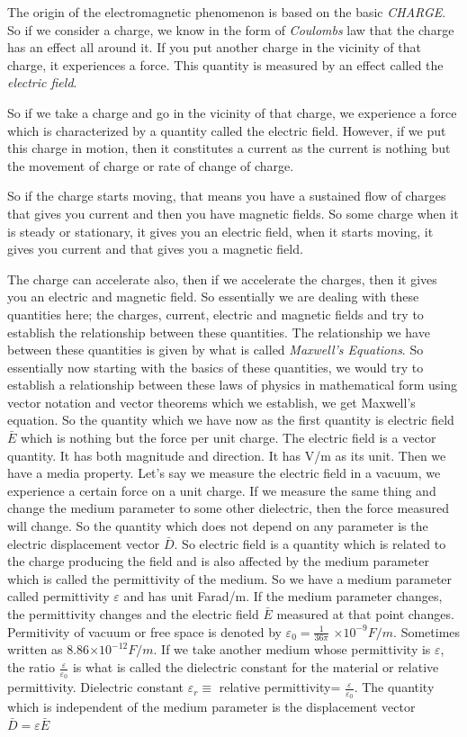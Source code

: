 The origin of the electromagnetic phenomenon is based on the basic \emph{CHARGE}. So if we consider a charge, we know in the form of \emph{Coulombs} law that the charge has an effect all around it. If you put another charge in the vicinity of that charge, it experiences a force. This quantity is measured by an effect called the \emph{electric field}.

So if we take a charge and go in the vicinity of that charge, we experience a force which is characterized by a quantity called the electric field. However, if we put this charge in motion, then it constitutes a current as the current is nothing but the movement of charge or rate of change of charge.

So if the charge starts moving, that means you have a sustained flow of charges that gives you current and then you have magnetic fields. So some charge when it is steady or stationary, it gives you an electric field, when it starts moving, it gives you current and that gives you a magnetic field.

The charge can accelerate also, then if we accelerate the charges, then it gives you an electric and magnetic field. So essentially we are dealing with these quantities here; the charges, current, electric and magnetic fields and try to establish the relationship between these quantities. The relationship we have between these quantities is given by what is called \emph{Maxwell's Equations}. So essentially now starting with the basics of these quantities, we would try to establish a relationship between these laws of physics in mathematical form using vector notation and vector theorems which we establish, we get Maxwell's equation. So the quantity which we have now as the first quantity is electric field $\bar{E}$ which is nothing but the force per unit charge. The electric field is a vector quantity. It has both magnitude and direction. It has V/m as its unit. Then we have a media property. Let's say we measure the electric field in a vacuum, we experience a certain force on a unit charge. If we measure the same thing and change the medium parameter to some other dielectric, then the force measured will change. So the quantity which does not depend on any parameter is the electric displacement vector $\bar{D}$.
So electric field is a quantity which is related to the charge producing the field and is also affected by the medium parameter which is called the permittivity of the medium. So we have a medium parameter called permittivity $\varepsilon$ and has unit Farad/m. If the medium parameter changes, the permittivity changes and the electric field $\bar{E}$ measured at that point changes. Permitivity of vacuum or free space is denoted by $\varepsilon_{0} =\frac{1}{36\pi}$ $\times 10^{-9}F/m$. Sometimes written as 8.86$\times10^{-12}F/m.$
If we take another medium whose permittivity is $\varepsilon$, the ratio $\frac{\varepsilon}{\varepsilon_{0}}$ is what is called the dielectric constant for the material or relative permittivity. 
Dielectric constant $\varepsilon_{r}\equiv$ relative permittivity= $\frac{\varepsilon}{\varepsilon_{0}}$.
The quantity which is independent of the medium parameter is the displacement vector $\bar{D}=\varepsilon \bar{E}$

